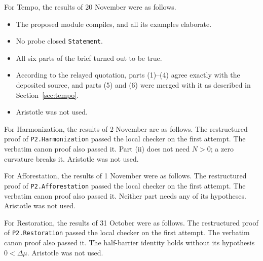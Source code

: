 \documentclass[11pt]{article}
\theoremstyle{definition}
\theoremstyle{remark}
\begin{document}
For Tempo, the results of 20 November were as follows.
\begin{itemize}
\item The proposed module compiles, and all its examples elaborate.
\item No probe closed \texttt{Statement}.
\item All six parts of the brief turned out to be true.
\item According to the relayed quotation, parts (1)--(4) agree exactly with the deposited source, and parts (5) and (6) were merged with it as described in Section~\ref{sec:tempo}.
\item Aristotle was not used.
\end{itemize}

For Harmonization, the results of 2 November are as follows.
The restructured proof of \texttt{P2.Harmonization} passed the local checker on the first attempt.
The verbatim canon proof also passed it. Part (ii) does not need $N>0$; a zero curvature breaks it.
Aristotle was not used.

For Afforestation, the results of 1 November were as follows.
The restructured proof of \texttt{P2.Afforestation} passed the local checker on the first attempt.
The verbatim canon proof also passed it. Neither part needs any of its hypotheses.
Aristotle was not used.

For Restoration, the results of 31 October were as follows.
The restructured proof of \texttt{P2.Restoration} passed the local checker on the first attempt.
The verbatim canon proof also passed it.
The half-barrier identity holds without its hypothesis $0<\Delta\mu$.
Aristotle was not used.
\end{document}
